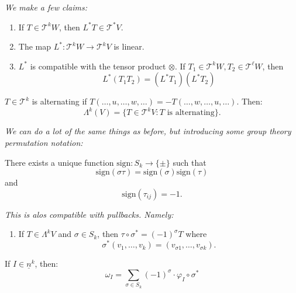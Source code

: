 \documentclass{article}
\numberwithin{equation}{section}
\begin{document}
\textit{We make a few claims:}
\begin{enumerate}
    \item If $T\in \mathcal{T}^kW$, then $L^*T \in \mathcal{T}^*V.$
    \item The map $L^*: \mathcal{T}^kW \rightarrow \mathcal{T}^kV$ is linear.
    \item $L^*$ is compatible with the tensor product $\otimes$. If $T_1\in\mathcal{T}^kW,T_2\in\mathcal{T}^\ell W$, then 
    \begin{equation}
        L^*(T_1T_2) = (L^*T_1)(L^*T_2)
    \end{equation}
\end{enumerate}
\begin{definition}
    $T \in \mathcal{T}^k$ is alternating if $T(\dots,u,\dots,w,\dots) = -T(\dots,w,\dots,u,\dots).$ Then:
    \begin{equation}
        \Lambda^k(V) = \{T\in\mathcal{T}^k V: T\text{ is alternating}\}. 
    \end{equation}
\end{definition}
\textit{We can do a lot of the same things as before, but introducing some group theory permutation notation:}
\begin{theorem}
    There exists a unique function $\text{sign}: S_k \rightarrow \{\pm\}$ such that
    \begin{equation}
        \text{sign}(\sigma \tau) = \text{sign}(\sigma)\text{sign}(\tau)
    \end{equation}
    and 
    \begin{equation}
        \text{sign}(\tau_{ij}) = -1.
    \end{equation}
\end{theorem}
\textit{This is alos compatible with pullbacks. Namely:}
\begin{enumerate}
    \item If $T\in\Lambda^kV$ and $\sigma \in S_k$, then $\tau \circ \sigma^* = (-1)^\sigma T$ where 
    \begin{equation}
        \sigma^*(v_1,\dots,v_k) = (v_{\sigma 1}, \dots, v_{\sigma k}).
    \end{equation}
\end{enumerate}
\begin{definition}
    If $I\in \underline{n}^k$, then:
    \begin{equation}
        \omega_I = \sum_{\sigma \in S_k} (-1)^\sigma \cdot \varphi_I \circ \sigma^*
    \end{equation}
\end{definition}
\end{document}
